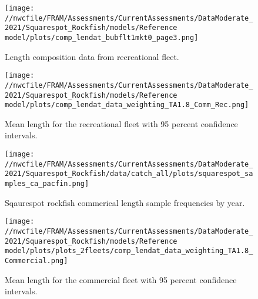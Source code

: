 \documentclass[11pt,
  english,
  a4paper,
]{article}
\begin{document}
\begin{figure}
\centering
\texttt{[image: //nwcfile/FRAM/Assessments/CurrentAssessments/DataModerate\_2021/Squarespot\_Rockfish/models/Reference model/plots/comp\_lendat\_bubflt1mkt0\_page3.png]}
\caption{Length composition data from recreational fleet.\label{fig:rec-len-data}}
\end{figure}

\tagmcend\tagstructend


\begin{figure}
\centering
\texttt{[image: //nwcfile/FRAM/Assessments/CurrentAssessments/DataModerate\_2021/Squarespot\_Rockfish/models/Reference model/plots/comp\_lendat\_data\_weighting\_TA1.8\_Comm\_Rec.png]}
\caption{Mean length for the recreational fleet with 95 percent confidence intervals.\label{fig:rec-mean-len-data}}
\end{figure}

\tagmcend\tagstructend


\begin{figure}
\centering
\texttt{[image: //nwcfile/FRAM/Assessments/CurrentAssessments/DataModerate\_2021/Squarespot\_Rockfish/data/catch\_all/plots/squarespot\_samples\_ca\_pacfin.png]}
\caption{Sqaurespot rockfish commerical length sample frequencies by year.\label{fig:squarespot_samples_ca_pacfin}}
\end{figure}

\tagmcend\tagstructend


\begin{figure}
\centering
\texttt{[image: //nwcfile/FRAM/Assessments/CurrentAssessments/DataModerate\_2021/Squarespot\_Rockfish/models/Reference model/plots/plots\_2fleets/comp\_lendat\_data\_weighting\_TA1.8\_Commercial.png]}
\caption{Mean length for the commercial fleet with 95 percent confidence intervals.\label{fig:comm-mean-len-data}}
\end{figure}
\end{document}
